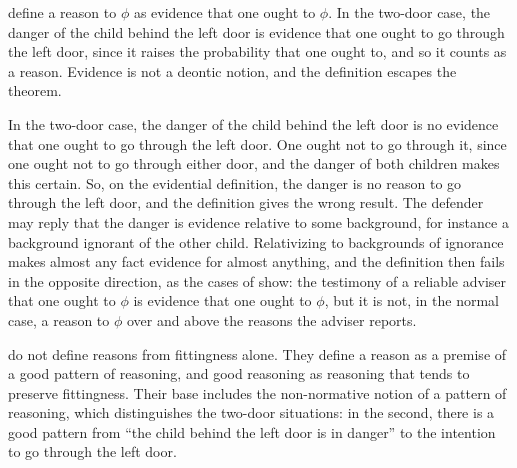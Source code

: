\documentclass{situationist-preprint}
\begin{document}
\begin{objection}\label{o:evidence}
\citet{KearnsStar2009} define a reason to $\phi$ as evidence that one ought to $\phi$. In the two-door case, the danger of the child behind the left door is evidence that one ought to go through the left door, since it raises the probability that one ought to, and so it counts as a reason. Evidence is not a deontic notion, and the definition escapes the theorem.
\end{objection}

\begin{reply}
In the two-door case, the danger of the child behind the left door is no evidence that one ought to go through the left door. One ought not to go through it, since one ought not to go through either door, and the danger of both children makes this certain. So, on the evidential definition, the danger is no reason to go through the left door, and the definition gives the wrong result. The defender may reply that the danger is evidence relative to some background, for instance a background ignorant of the other child. Relativizing to backgrounds of ignorance makes almost any fact evidence for almost anything, and the definition then fails in the opposite direction, as the cases of \citet{Brunero2009} show: the testimony of a reliable adviser that one ought to $\phi$ is evidence that one ought to $\phi$, but it is not, in the normal case, a reason to $\phi$ over and above the reasons the adviser reports.
\end{reply}

\begin{objection}\label{o:fit}
\citet{McHughWay2016} do not define reasons from fittingness alone. They define a reason as a premise of a good pattern of reasoning, and good reasoning as reasoning that tends to preserve fittingness. Their base includes the non-normative notion of a pattern of reasoning, which distinguishes the two-door situations: in the second, there is a good pattern from \enquote{the child behind the left door is in danger} to the intention to go through the left door.
\end{objection}
\end{document}

